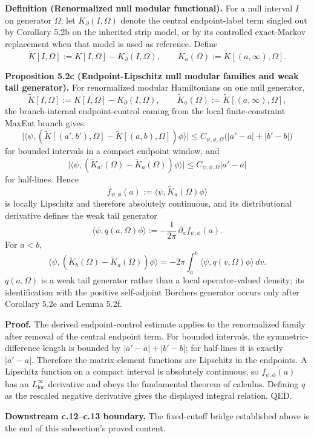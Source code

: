 \textbf{Definition (Renormalized null modular functional).} For a null interval \(I\) on generator \(\Omega\), let \(K_\partial(I,\Omega)\) denote the central endpoint-label term singled out by Corollary 5.2b on the inherited strip model, or by its controlled exact-Markov replacement when that model is used as reference. Define
\[
\widetilde K[I,\Omega]
:=
K[I,\Omega]-K_\partial(I,\Omega),
\qquad
\widetilde K_a(\Omega):=\widetilde K[(a,\infty),\Omega].
\]

\textbf{Proposition 5.2c (Endpoint-Lipschitz null modular families and weak tail generator).} For renormalized modular Hamiltonians on one null generator,
\[
\widetilde K[I,\Omega]
:=
K[I,\Omega]-K_\partial(I,\Omega),
\qquad
\widetilde K_a(\Omega):=\widetilde K[(a,\infty),\Omega],
\]
the branch-internal endpoint-control coming from the local finite-constraint MaxEnt branch gives:
\[
\bigl|
\langle\psi,(\widetilde K[(a',b'),\Omega]-\widetilde K[(a,b),\Omega])\phi\rangle
\bigr|
\le
C_{\psi,\phi,\Omega}\bigl(|a'-a|+|b'-b|\bigr)
\]
for bounded intervals in a compact endpoint window, and
\[
\bigl|
\langle\psi,(\widetilde K_{a'}(\Omega)-\widetilde K_a(\Omega))\phi\rangle
\bigr|
\le
C_{\psi,\phi,\Omega}|a'-a|
\]
for half-lines. Hence
\[
f_{\psi,\phi}(a):=\langle\psi,\widetilde K_a(\Omega)\phi\rangle
\]
is locally Lipschitz and therefore absolutely continuous, and its distributional derivative defines the weak tail generator
\[
\langle\psi,q(a,\Omega)\phi\rangle
:=
-\frac{1}{2\pi}\,\partial_a f_{\psi,\phi}(a).
\]
For \(a<b\),
\[
\langle\psi,(\widetilde K_b(\Omega)-\widetilde K_a(\Omega))\phi\rangle
=
-2\pi\int_a^b \langle\psi,q(v,\Omega)\phi\rangle\,dv.
\]
\(q(a,\Omega)\) is a weak tail generator rather than a local operator-valued density; its identification with the positive self-adjoint Borchers generator occurs only after Corollary 5.2e and Lemma 5.2f.

\textbf{Proof.} The derived endpoint-control estimate applies to the renormalized family after removal of the central endpoint term. For bounded intervals, the symmetric-difference length is bounded by \(|a'-a|+|b'-b|\); for half-lines it is exactly \(|a'-a|\). Therefore the matrix-element functions are Lipschitz in the endpoints. A Lipschitz function on a compact interval is absolutely continuous, so \(f_{\psi,\phi}(a)\) has an \(L^\infty_{\mathrm{loc}}\) derivative and obeys the fundamental theorem of calculus. Defining \(q\) as the rescaled negative derivative gives the displayed integral relation. QED.

\textbf{Downstream c.12--c.13 boundary.} The fixed-cutoff bridge established above is the end of this subsection's proved content.

